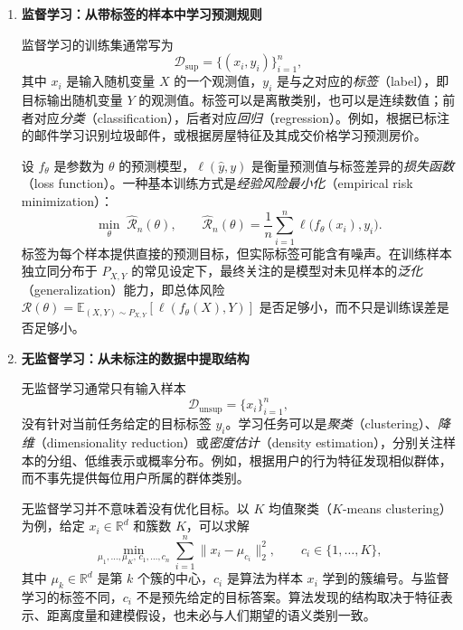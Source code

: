 \begin{enumerate}
  \item \textbf{监督学习：从带标签的样本中学习预测规则}

  监督学习的训练集通常写为
  \[
    \mathcal{D}_{\mathrm{sup}}=\{(x_i,y_i)\}_{i=1}^{n},
  \]
  其中 $x_i$ 是输入随机变量 $X$ 的一个观测值，$y_i$ 是与之对应的\emph{标签}（label），即目标输出随机变量 $Y$ 的观测值。标签可以是离散类别，也可以是连续数值；前者对应\emph{分类}（classification），后者对应\emph{回归}（regression）。例如，根据已标注的邮件学习识别垃圾邮件，或根据房屋特征及其成交价格学习预测房价。

  设 $f_\theta$ 是参数为 $\theta$ 的预测模型，$\ell(\widehat y,y)$ 是衡量预测值与标签差异的\emph{损失函数}（loss function）。一种基本训练方式是\emph{经验风险最小化}（empirical risk minimization）：
  \begin{equation}
    \min_{\theta}\;\widehat{\mathcal{R}}_n(\theta),
    \qquad
    \widehat{\mathcal{R}}_n(\theta)
    =\frac{1}{n}\sum_{i=1}^{n}\ell\bigl(f_\theta(x_i),y_i\bigr).
  \end{equation}
  标签为每个样本提供直接的预测目标，但实际标签可能含有噪声。在训练样本独立同分布于 $P_{X,Y}$ 的常见设定下，最终关注的是模型对未见样本的\emph{泛化}（generalization）能力，即总体风险 $\mathcal{R}(\theta)=\mathbb{E}_{(X,Y)\sim P_{X,Y}}[\ell(f_\theta(X),Y)]$ 是否足够小，而不只是训练误差是否足够小。

  \item \textbf{无监督学习：从未标注的数据中提取结构}\nopagebreak

  无监督学习通常只有输入样本
  \[
    \mathcal{D}_{\mathrm{unsup}}=\{x_i\}_{i=1}^{n},
  \]
  没有针对当前任务给定的目标标签 $y_i$。学习任务可以是\emph{聚类}（clustering）、\emph{降维}（dimensionality reduction）或\emph{密度估计}（density estimation），分别关注样本的分组、低维表示或概率分布。例如，根据用户的行为特征发现相似群体，而不事先提供每位用户所属的群体类别。

  无监督学习并不意味着没有优化目标。以 $K$ 均值聚类（$K$-means clustering）为例，给定 $x_i\in\mathbb{R}^{d}$ 和簇数 $K$，可以求解
  \begin{equation}
    \min_{\mu_1,\ldots,\mu_K,\,c_1,\ldots,c_n}
    \sum_{i=1}^{n}\lVert x_i-\mu_{c_i}\rVert_2^2,
    \qquad c_i\in\{1,\ldots,K\},
  \end{equation}
  其中 $\mu_k\in\mathbb{R}^{d}$ 是第 $k$ 个簇的中心，$c_i$ 是算法为样本 $x_i$ 学到的簇编号。与监督学习的标签不同，$c_i$ 不是预先给定的目标答案。算法发现的结构取决于特征表示、距离度量和建模假设，也未必与人们期望的语义类别一致。


\end{enumerate}
